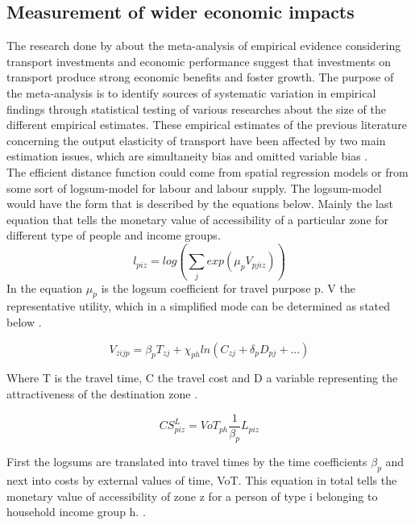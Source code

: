 \documentclass[a4paper, 12 pt]{article}   	%
\begin{document}
\subsection{Measurement of wider economic impacts}

The research done by \cite{melo} about the meta-analysis of empirical evidence considering transport investments and economic performance suggest that investments on transport produce strong economic benefits and foster growth. The purpose of the meta-analysis is to identify sources of systematic variation in empirical findings through statistical testing of various researches about the size of the different empirical estimates. These empirical estimates of the previous literature concerning the output elasticity of transport have been affected by two main estimation issues, which are simultaneity bias and omitted variable bias \citep{melo}.  \\
 

The efficient distance function could come from spatial regression models or from some sort of logsum-model for labour and labour supply. The logsum-model would have the form that is described by the equations below. Mainly the last equation that tells the monetary value of accessibility of a particular zone for different type of people and income groups\citep{geurs}.\\

\begin{equation}
l_{piz} = log(\sum_j exp(\mu_p V_{pjiz}))
\end{equation}
In the equation $\mu_p$ is the logsum coefficient for travel purpose p. 
V the representative utility, which in a simplified mode can be determined as stated below \citep{geurs}.

\begin{equation}
V_{zijp} = \beta_p T_{zj} + \chi_{ph} ln(C_{zj} + \delta_p D_{pj} + ...)
\end{equation}

Where T is the travel time, C the travel cost and D a variable representing the attractiveness of the destination zone  \citep{geurs}.

\begin{equation}
CS_{piz}^L = VoT_{ph}  \frac{1}{\beta_p}  L_{piz}
\end{equation}

First the logsums are translated into travel times by the time coefficients $\beta_p$ and next into costs by external values of time, VoT. This equation in total tells the monetary value of accessibility of zone z for a person of type i belonging to household income group h. \citep{geurs}.
\end{document}
